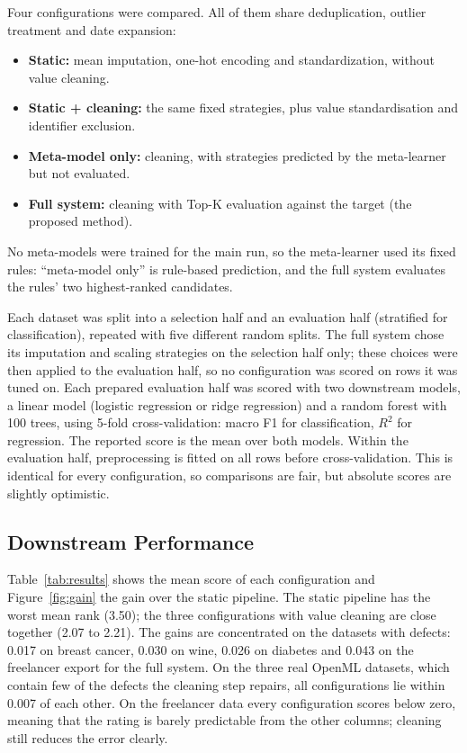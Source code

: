 \documentclass[11pt,a4paper]{article}
\begin{document}
Four configurations were compared. All of them share deduplication, outlier treatment and date expansion:

\begin{itemize}
    \item \textbf{Static:} mean imputation, one-hot encoding and standardization, without value cleaning.
    \item \textbf{Static + cleaning:} the same fixed strategies, plus value standardisation and identifier exclusion.
    \item \textbf{Meta-model only:} cleaning, with strategies predicted by the meta-learner but not evaluated.
    \item \textbf{Full system:} cleaning with Top-K evaluation against the target (the proposed method).
\end{itemize}

No meta-models were trained for the main run, so the meta-learner used its fixed rules: ``meta-model only'' is rule-based prediction, and the full system evaluates the rules' two highest-ranked candidates.

Each dataset was split into a selection half and an evaluation half (stratified for classification), repeated with five different random splits. The full system chose its imputation and scaling strategies on the selection half only; these choices were then applied to the evaluation half, so no configuration was scored on rows it was tuned on. Each prepared evaluation half was scored with two downstream models, a linear model (logistic regression or ridge regression) and a random forest with 100 trees, using 5-fold cross-validation: macro F1 for classification, $R^2$ for regression. The reported score is the mean over both models. Within the evaluation half, preprocessing is fitted on all rows before cross-validation. This is identical for every configuration, so comparisons are fair, but absolute scores are slightly optimistic.

\subsection{Downstream Performance}

Table~\ref{tab:results} shows the mean score of each configuration and Figure~\ref{fig:gain} the gain over the static pipeline. The static pipeline has the worst mean rank (3.50); the three configurations with value cleaning are close together (2.07 to 2.21). The gains are concentrated on the datasets with defects: 0.017 on breast cancer, 0.030 on wine, 0.026 on diabetes and 0.043 on the freelancer export for the full system. On the three real OpenML datasets, which contain few of the defects the cleaning step repairs, all configurations lie within 0.007 of each other. On the freelancer data every configuration scores below zero, meaning that the rating is barely predictable from the other columns; cleaning still reduces the error clearly.
\end{document}
